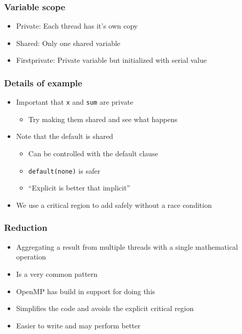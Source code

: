 \subsubsection{Variable scope}\label{variable-scope}

\begin{itemize}
\itemsep1pt\parskip0pt
\item
  Private: Each thread has it's own copy
\item
  Shared: Only one shared variable
\item
  Firstprivate: Private variable but initialized with serial value
\end{itemize}

\subsubsection{Details of example}\label{details-of-example}

\begin{itemize}
\itemsep1pt\parskip0pt
\item
  Important that \texttt{x} and \texttt{sum} are private

  \begin{itemize}
  \itemsep1pt\parskip0pt
  \item
    Try making them shared and see what happens
  \end{itemize}
\item
  Note that the default is shared

  \begin{itemize}
  \itemsep1pt\parskip0pt
  \item
    Can be controlled with the default clause
  \item
    \texttt{default(none)} is safer
  \item
    ``Explicit is better that implicit''
  \end{itemize}
\item
  We use a critical region to add safely without a race condition
\end{itemize}

\subsubsection{Reduction}\label{reduction}

\begin{itemize}
\itemsep1pt\parskip0pt
\item
  Aggregating a result from multiple threads with a single mathematical
  operation
\item
  Is a very common pattern
\item
  OpenMP has build in support for doing this
\item
  Simplifies the code and avoids the explicit critical region
\item
  Easier to write and may perform better
\end{itemize}

